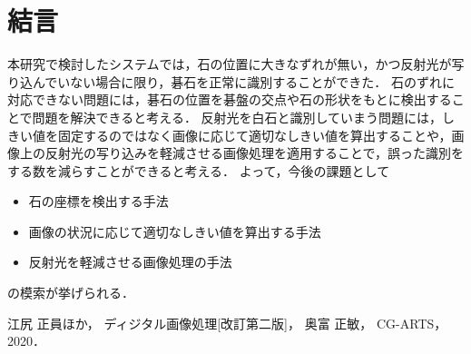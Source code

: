 \documentclass[summary]{nitocs}
\numberwithin{equation}{section}
\begin{document}
    \section{結言}\label{conclusion} %
        本研究で検討したシステムでは，石の位置に大きなずれが無い，かつ反射光が写り込んでいない場合に限り，碁石を正常に識別することができた．
        石のずれに対応できない問題には，碁石の位置を碁盤の交点や石の形状をもとに検出することで問題を解決できると考える．
        反射光を白石と識別していまう問題には，しきい値を固定するのではなく画像に応じて適切なしきい値を算出することや，画像上の反射光の写り込みを軽減させる画像処理を適用することで，誤った識別をする数を減らすことができると考える．
        よって，今後の課題として
        \begin{itemize}
            \item 石の座標を検出する手法
            \item 画像の状況に応じて適切なしきい値を算出する手法
            \item 反射光を軽減させる画像処理の手法
        \end{itemize}
        の模索が挙げられる．    

    \begin{thebibliography}{10}

        江尻 正員ほか，
        ディジタル画像処理[改訂第二版]，
        奥富 正敏，
        CG-ARTS，
        2020．
    \end{thebibliography}
\end{document}
